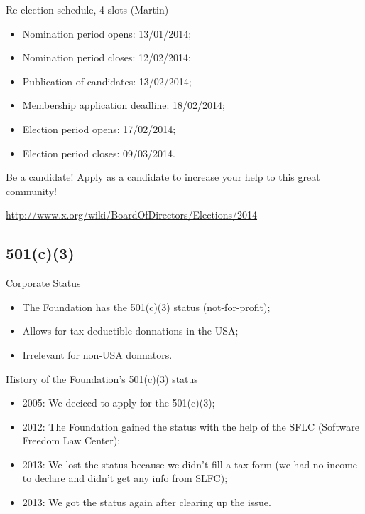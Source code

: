 \documentclass{beamer}
\begin{document}
		\begin{frame}
			\begin{block}{Re-election schedule, 4 slots (Martin)}
				\begin{itemize}
					\item Nomination period opens: 13/01/2014;
					\item Nomination period closes: 12/02/2014;
					\item Publication of candidates: 13/02/2014;
					\item Membership application deadline: 18/02/2014;
					\item Election period opens: 17/02/2014;
					\item Election period closes: 09/03/2014.
				\end{itemize}
			\end{block}

			\begin{block}{Be a candidate!}
				Apply as a candidate to increase your help to this great community!
			\end{block}

			\begin{block}{}
				\url{http://www.x.org/wiki/BoardOfDirectors/Elections/2014}
			\end{block}
		\end{frame}

		\subsection{501(c)(3)}
		\begin{frame}
			\begin{block}{Corporate Status}
				\begin{itemize}
					\item The Foundation has the 501(c)(3) status (not-for-profit);
					\item Allows for tax-deductible donnations in the USA;
					\item Irrelevant for non-USA donnators.
				\end{itemize}
			\end{block}

			\begin{block}{History of the Foundation's 501(c)(3) status}
				\begin{itemize}
					\item 2005: We deciced to apply for the 501(c)(3);
					\item 2012: The Foundation gained the status with the help
of the SFLC (Software Freedom Law Center);
					\item 2013: We lost the status because we didn't
fill a tax form (we had no income to declare and didn't get any info from SLFC);
					\item 2013: We got the status again after clearing up the issue.
				\end{itemize}
			\end{block}
		\end{frame}
\end{document}
